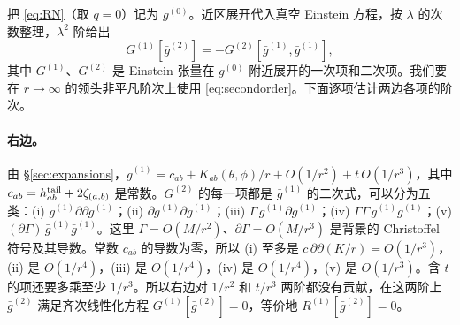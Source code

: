 \documentclass[11pt,a4paper]{ctexart}
\numberwithin{equation}{section}
\begin{document}
把 \eqref{eq:RN}（取 $q=0$）记为 $g^{(0)}$。近区展开代入真空 Einstein 方程，按 $\lambda$ 的次数整理，$\lambda^2$ 阶给出
\begin{equation}
G^{(1)}[\bar g^{(2)}]=-G^{(2)}[\bar g^{(1)},\bar g^{(1)}],
\label{eq:secondorder}
\end{equation}
其中 $G^{(1)}$、$G^{(2)}$ 是 Einstein 张量在 $g^{(0)}$ 附近展开的一次项和二次项。我们要在 $r\to\infty$ 的领头非平凡阶次上使用 \eqref{eq:secondorder}。下面逐项估计两边各项的阶次。

\paragraph{右边。}由 \S\ref{sec:expansions}，$\bar g^{(1)}=c_{ab}+K_{ab}(\theta,\phi)/r+O(1/r^2)+t\,O(1/r^3)$，其中 $c_{ab}=h^{\rm tail}_{ab}+2\zeta_{(a,b)}$ 是常数。$G^{(2)}$ 的每一项都是 $\bar g^{(1)}$ 的二次式，可以分为五类：(i) $\bar g^{(1)}\partial\partial\bar g^{(1)}$；(ii) $\partial\bar g^{(1)}\partial\bar g^{(1)}$；(iii) $\Gamma\,\bar g^{(1)}\partial\bar g^{(1)}$；(iv) $\Gamma\Gamma\,\bar g^{(1)}\bar g^{(1)}$；(v) $(\partial\Gamma)\,\bar g^{(1)}\bar g^{(1)}$。这里 $\Gamma=O(M/r^2)$、$\partial\Gamma=O(M/r^3)$ 是背景的 Christoffel 符号及其导数。常数 $c_{ab}$ 的导数为零，所以 (i) 至多是 $c\,\partial\partial(K/r)=O(1/r^3)$，(ii) 是 $O(1/r^4)$，(iii) 是 $O(1/r^4)$，(iv) 是 $O(1/r^4)$，(v) 是 $O(1/r^3)$。含 $t$ 的项还要多乘至少 $1/r^3$。所以右边对 $1/r^2$ 和 $t/r^3$ 两阶都没有贡献，在这两阶上 $\bar g^{(2)}$ 满足齐次线性化方程 $G^{(1)}[\bar g^{(2)}]=0$，等价地 $R^{(1)}[\bar g^{(2)}]=0$。
\end{document}
